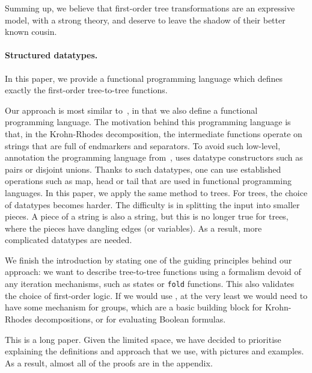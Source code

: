 Summing up, we believe that first-order  tree transformations are an expressive model, with a strong theory, and deserve to leave the shadow of their better known \mso cousin.


\paragraph*{Structured datatypes.} In this paper, we provide a functional programming language which defines exactly the first-order tree-to-tree functions. 

Our approach is most similar to~\cite{bojanczykRegularFirstOrderList2018},  in that we also define a functional programming language. The motivation behind this programming language is that, in the  Krohn-Rhodes decomposition, the   intermediate functions  operate on strings that are full of endmarkers and separators.   To avoid such low-level, annotation the programming language from~\cite{bojanczykRegularFirstOrderList2018}, uses  datatype constructors such as pairs or disjoint unions.  Thanks to such datatypes, one can use established operations such as map, head or tail that are used in functional programming languages. 
In this paper, we apply the same method to trees.
For trees,  the choice of datatypes  becomes harder. The difficulty is in splitting the input into smaller pieces. A piece of a string is also a string, but this is no longer true for trees, where the pieces have dangling edges (or variables). As a result, more complicated  datatypes are needed.

We finish the introduction by stating 
one of the guiding principles behind our approach:  we want to describe tree-to-tree functions using a formalism devoid of any iteration mechanisms, such as states or {\tt fold} functions. This also validates the choice of first-order logic. If we would use \mso, at the very least we would need to have some mechanism for groups, which are a basic building block for Krohn-Rhodes decompositions, or for evaluating Boolean formulas. 


This is a long paper. Given the limited space, we have decided to prioritise  explaining the definitions and approach that we use, with pictures and examples. As a result, almost all of the proofs are in the appendix. 



